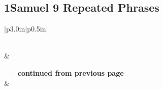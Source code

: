 \subsection{1Samuel 9 Repeated Phrases}


\normalsize
 
\begin{center}
\begin{longtable}{|p{3.0in}|p{0.5in}|}
\caption[1Samuel 9 Repeated Phrases]{1Samuel 9 Repeated Phrases}\label{table:Repeated Phrases 1Samuel 9} \\
\hline {} &  \\ \hline 
\endfirsthead
 
{{\bfseries \tablename\ \thetable{} -- continued from previous page}} \\  
\hline {} &  \\ \hline 
\endhead
 

\end{longtable}
\end{center}
